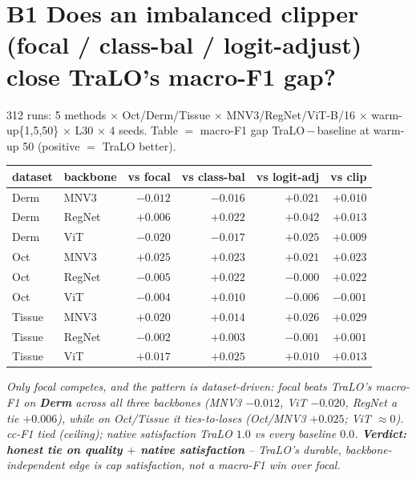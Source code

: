 \documentclass[10pt,a4paper]{article}
\newcommand{\vs}[2]{#1\,$-$\,#2}
\newcommand{\fnd}[1]{{\small\textit{#1}}\par}
\newcommand{\tbl}[1]{\begin{center}\footnotesize #1\end{center}}
\begin{document}
\section*{B1 \; Does an imbalanced clipper (focal / class-bal / logit-adjust) close TraLO's macro-F1 gap?}
{\footnotesize 312 runs: 5 methods $\times$ Oct/Derm/Tissue $\times$ MNV3/RegNet/ViT-B/16 $\times$
warm-up\{1,5,50\} $\times$ L30 $\times$ 4 seeds. Table $=$ macro-F1 gap \vs{TraLO}{baseline} at warm-up 50
(positive $=$ TraLO better).}
\tbl{\begin{tabular}{llrrrr}
\toprule
dataset & backbone & vs focal & vs class-bal & vs logit-adj & vs clip \\
\midrule
Derm   & MNV3   & $\mathbf{-0.012}$ & $\mathbf{-0.016}$ & $+0.021$ & $+0.010$ \\
Derm   & RegNet & $+0.006$ & $+0.022$ & $+0.042$ & $+0.013$ \\
Derm   & ViT    & $\mathbf{-0.020}$ & $\mathbf{-0.017}$ & $+0.025$ & $+0.009$ \\
Oct    & MNV3   & $+0.025$ & $+0.023$ & $+0.021$ & $+0.023$ \\
Oct    & RegNet & $-0.005$ & $+0.022$ & $-0.000$ & $+0.022$ \\
Oct    & ViT    & $-0.004$ & $+0.010$ & $-0.006$ & $-0.001$ \\
Tissue & MNV3   & $+0.020$ & $+0.014$ & $+0.026$ & $+0.029$ \\
Tissue & RegNet & $-0.002$ & $+0.003$ & $-0.001$ & $+0.001$ \\
Tissue & ViT    & $+0.017$ & $+0.025$ & $+0.010$ & $+0.013$ \\
\bottomrule
\end{tabular}}
\fnd{Only focal competes, and the pattern is \emph{dataset-driven}: focal beats TraLO's macro-F1 on
\textbf{Derm} across all three backbones (MNV3 $-0.012$, ViT $-0.020$, RegNet a tie $+0.006$), while on
Oct/Tissue it ties-to-loses (Oct/MNV3 $+0.025$; ViT $\approx0$). cc-F1 tied (ceiling); native satisfaction
TraLO $1.0$ vs every baseline $0.0$. \textbf{Verdict: honest tie on quality $+$ native satisfaction} -- TraLO's
durable, backbone-independent edge is cap satisfaction, not a macro-F1 win over focal.}

\end{document}
